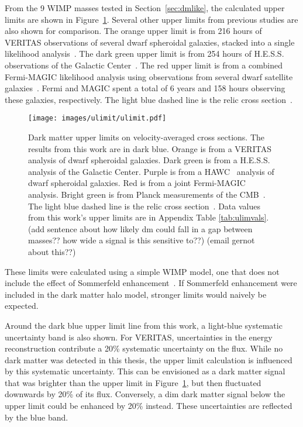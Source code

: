   From the 9 WIMP masses tested in Section~\ref{sec:dmlike}, the calculated upper limits are shown in Figure~\ref{fig:ulim}.
  Several other upper limits from previous studies are also shown for comparison.
  The orange upper limit is from 216 hours of VERITAS observations of several dwarf spheroidal galaxies, stacked into a single likelihood analysis~\cite{verdsphul}.
  The dark green upper limit is from 254 hours of H.E.S.S. observations of the Galactic Center~\cite{hessgcul}.
  The red upper limit is from a combined Fermi-MAGIC likelihood analysis using observations from several dwarf satellite galaxies~\cite{fermagicul}.
  Fermi and MAGIC spent a total of 6 years and 158 hours observing these galaxies, respectively.
  The light blue dashed line is the relic cross section~\cite{updatedWIMPRelicCrossSection}.
  
  \begin{figure}[ht]
    \centering
    \texttt{[image: images/ulimit/ulimit.pdf]}
    \caption[Dark Matter Upper Limit]{
      Dark matter upper limits on velocity-averaged cross sections.
      The results from this work are in dark blue.
      Orange is from a VERITAS~\cite{veritas_dm_limit} analysis of dwarf spheroidal galaxies.
      Dark green is from a H.E.S.S.~\cite{hess_dm_limit} analysis of the Galactic Center.
      Purple is from a HAWC~\cite{hawc_dm_limit} analysis of dwarf spheroidal galaxies.
      Red is from a joint Fermi-MAGIC~\cite{fermagicul} analysis.
      Bright green is from Planck measurements of the CMB~\cite{planck_dm_limit}.
      The light blue dashed line is the relic cross section~\cite{updatedWIMPRelicCrossSection}.
      Data values from this work's upper limits are in Appendix Table \ref{tab:ulimvals}.
      {\color{red}(add sentence about how likely dm could fall in a gap between masses?? how wide a signal is this sensitive to??)}
      {\color{red}(email gernot about this??)}
    }
    \label{fig:ulim}
  \end{figure}
  
  These limits were calculated using a simple WIMP model, one that does not include the effect of Sommerfeld enhancement~\cite{sommerfeld}.
  If Sommerfeld enhancement were included in the dark matter halo model, stronger limits would naively be expected.
  
  Around the dark blue upper limit line from this work, a light-blue systematic uncertainty band is also shown.
  For VERITAS, uncertainties in the energy reconstruction contribute a \nicetilde{}20\% systematic uncertainty on the flux.
  While no dark matter was detected in this thesis, the upper limit calculation is influenced by this systematic uncertainty.
  This can be envisioned as a dark matter signal that was brighter than the upper limit in Figure~\ref{fig:ulim}, but then fluctuated downwards by 20\% of its flux.
  Conversely, a dim dark matter signal below the upper limit could be enhanced by 20\% instead.
  These uncertainties are reflected by the blue band.
  
